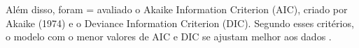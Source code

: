 \begin{comment}
---------------------------

Para verificar a adequação do melhor modelo, TLI e CFI são dois índices de ajuste usados na teoria de resposta ao item para avaliar o ajuste do modelo aos dados \cite{alvarenga2020item}.

 TLI significa Índice Tucker-Lewis e CFI significa Índice de Ajuste Comparativo. Esses índices de ajuste fornecem informações sobre o quão bem o modelo se ajusta às respostas dos itens observados. O TLI compara o ajuste do modelo especificado com um modelo nulo, enquanto o CFI compara o ajuste do modelo especificado com um modelo de linha de base. Valores mais altos de TLI e CFI indicam melhor ajuste entre o modelo e os dados. Esses índices de ajuste são aplicados no IRT para avaliar a adequação do modelo em representar a relação entre a característica latente e as respostas dos itens observados. 


RMSEA: O índice de raiz quadrada média do erro de aproximação (RMSEA) é um índice de ajuste absoluto que mede a discrepância média entre o modelo especificado e os dados observados. O valor do RMSEA varia de 0 a 1, e valores abaixo de 0,05 indicam um bom ajuste do modelo. Valores entre 0,05 e 0,08 indicam um ajuste razoável, enquanto valores acima de 0,10 indicam um ajuste pobre. O RMSEA é calculado como a diferença entre a discrepância média observada e a discrepância média esperada, dividida pelo número de graus de liberdade do modelo.

SRMR: O Índice Raiz Quadrada Média Residual Padronizada (SRMR) é uma medida de ajuste global que avalia a diferença entre as correlações observadas e as correlações estimadas pelo modelo. Em outras palavras, ele mede a discrepância entre as correlações amostrais e as correlações que o modelo estima. É uma medida padronizada, o que significa que ele é independente da escala de medida das variáveis do modelo. Ele é calculado dividindo o erro médio quadrático (EMQ) pelo erro médio quadrático residual (EMQr), que é a diferença entre o EMQ e o EMQ dos resíduos. O valor do SRMR varia de 0 a 1, sendo que valores menores indicam um melhor ajuste do modelo. Uma regra geral é que um valor de SRMR menor que 0,08 indica um bom ajuste do modelo, enquanto valores acima de 0,1 indicam um ajuste pobre. Valores entre 0,08 e 0,1 indicam um ajuste razoável.

(buscar referencias)
\end{comment}
Além disso, foram = avaliado o Akaike Information Criterion (AIC), criado por Akaike (1974) e o Deviance Information Criterion (DIC). Segundo esses critérios, o modelo com o menor valores de AIC e DIC se ajustam melhor aos dados \cite{raftery2006}.







